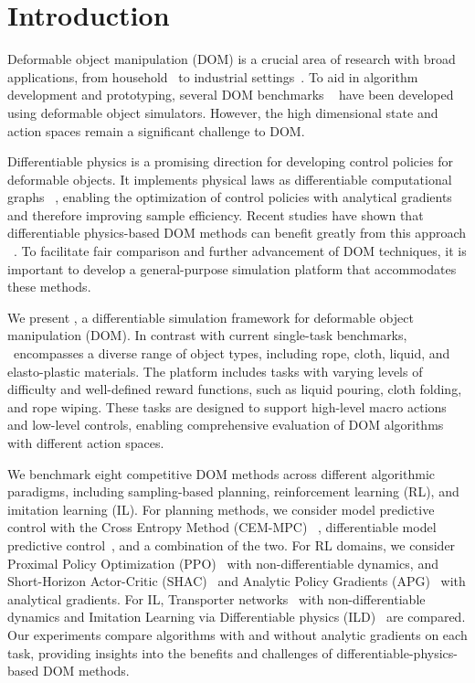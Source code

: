 \section{Introduction} 
\label{sec:introduction}

Deformable object manipulation (DOM) is a crucial area of research with broad applications, from household~\citep{maitin2010cloth,miller2011parametrized,gdoom} to industrial settings~\citep{miller2012geometric,zhu2022challenges}. To aid in algorithm development and prototyping, several DOM benchmarks ~\citep{softgym,plasticine} have been developed using deformable object simulators. However,  the high dimensional state and action spaces remain a significant challenge to DOM.

Differentiable physics is a promising direction for developing control policies for deformable objects. It implements physical laws as differentiable computational graphs ~\citep{Brax, Hu2020DiffTaichi}, enabling the optimization of control policies with analytical gradients and therefore improving sample efficiency. Recent studies have shown that differentiable physics-based DOM methods can benefit greatly from this approach ~\citep{plasticine, DiSec, SHAC, ILD}.  To facilitate fair comparison and further advancement of DOM techniques, it is important to develop a general-purpose simulation platform that accommodates these methods.  

We present \algo, a differentiable simulation framework for deformable object manipulation (DOM). In contrast with current single-task benchmarks, \algo\ encompasses a diverse range of object types, including rope, cloth, liquid, and elasto-plastic materials. The platform includes tasks with varying levels of difficulty and well-defined reward functions, such as liquid pouring, cloth folding, and rope wiping. These tasks are designed to support high-level macro actions and low-level controls, enabling comprehensive evaluation of DOM algorithms with different action spaces.

We benchmark eight competitive DOM methods across different algorithmic paradigms, including sampling-based planning, reinforcement learning (RL), and imitation learning (IL).
For planning methods, we consider model predictive control with the Cross Entropy Method (CEM-MPC) ~\citep{Richards2005RobustCM}, differentiable model predictive control~\citep{Hu2020DiffTaichi}, and a combination of the two. For RL domains, we consider Proximal Policy Optimization (PPO)~\citep{PPO} with non-differentiable dynamics, and Short-Horizon Actor-Critic (SHAC)~\citep{SHAC} and Analytic Policy Gradients (APG)~\citep{Brax} with analytical gradients. For IL, Transporter networks~\citep{transporter} with non-differentiable dynamics and Imitation Learning via Differentiable physics (ILD)~\citep{ILD} are compared. Our experiments compare algorithms with and without analytic gradients on each task, providing insights into the benefits and challenges of differentiable-physics-based DOM methods.

